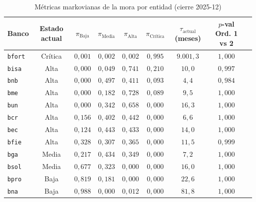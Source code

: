 \documentclass[11pt,letterpaper]{article}
\begin{document}
\begin{table}[H]
\centering
\caption{Métricas markovianas de la mora por entidad (cierre 2025-12)}
\label{tab:markov_bancos}
\small
\begin{tabular}{lcccccccc}
\toprule
Banco & Estado actual & \(\pi_{\text{Baja}}\) & \(\pi_{\text{Media}}\) & \(\pi_{\text{Alta}}\) & \(\pi_{\text{Crítica}}\) & \(\tau_{\text{actual}}\) (meses) & \(p\)-val Ord. 1 vs 2 \\
\midrule
\texttt{bfort} & Crítica & \(0{,}001\) & \(0{,}002\) & \(0{,}002\) & \(0{,}995\) & \(9.001{,}3\) & \(1{,}000\) \\
\texttt{bisa} & Alta & \(0{,}000\) & \(0{,}049\) & \(0{,}741\) & \(0{,}210\) & \(10{,}0\) & \(0{,}997\) \\
\texttt{bnb} & Alta & \(0{,}000\) & \(0{,}497\) & \(0{,}411\) & \(0{,}093\) & \(4{,}4\) & \(0{,}984\) \\
\texttt{bme} & Alta & \(0{,}000\) & \(0{,}182\) & \(0{,}728\) & \(0{,}089\) & \(9{,}5\) & \(1{,}000\) \\
\texttt{bun} & Alta & \(0{,}000\) & \(0{,}342\) & \(0{,}658\) & \(0{,}000\) & \(16{,}3\) & \(1{,}000\) \\
\texttt{bcr} & Alta & \(0{,}156\) & \(0{,}402\) & \(0{,}442\) & \(0{,}000\) & \(6{,}6\) & \(1{,}000\) \\
\texttt{bec} & Alta & \(0{,}124\) & \(0{,}443\) & \(0{,}433\) & \(0{,}000\) & \(14{,}0\) & \(1{,}000\) \\
\texttt{bfie} & Alta & \(0{,}328\) & \(0{,}307\) & \(0{,}365\) & \(0{,}000\) & \(11{,}5\) & \(0{,}999\) \\
\texttt{bga} & Media & \(0{,}217\) & \(0{,}434\) & \(0{,}349\) & \(0{,}000\) & \(7{,}2\) & \(1{,}000\) \\
\texttt{bsol} & Media & \(0{,}677\) & \(0{,}323\) & \(0{,}000\) & \(0{,}000\) & \(16{,}0\) & \(1{,}000\) \\
\texttt{bpro} & Baja & \(0{,}819\) & \(0{,}181\) & \(0{,}000\) & \(0{,}000\) & \(22{,}6\) & \(1{,}000\) \\
\texttt{bna} & Baja & \(0{,}988\) & \(0{,}000\) & \(0{,}012\) & \(0{,}000\) & \(81{,}8\) & \(1{,}000\) \\
\bottomrule
\end{tabular}
\end{table}
\end{document}
